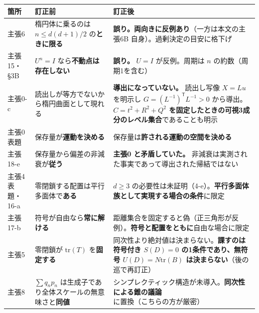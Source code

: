 \documentclass[
  10pt,
]{ltjsarticle}
\newcounter{none} %
\begin{document}
{\def\LTcaptype{none} %
\begin{longtable}[]{@{}
  >{\raggedright\arraybackslash}p{}
  >{\raggedright\arraybackslash}p{}
  >{\raggedright\arraybackslash}p{}@{}}
\toprule\noalign{}
\begin{minipage}[b]{\linewidth}\raggedright
箇所
\end{minipage} & \begin{minipage}[b]{\linewidth}\raggedright
訂正前
\end{minipage} & \begin{minipage}[b]{\linewidth}\raggedright
訂正後
\end{minipage} \\
\midrule\noalign{}
\endhead
\bottomrule\noalign{}
\endlastfoot
主張6 & 楕円体に乗るのは \(n\le d(d+1)/2\) の\textbf{ときに限る} &
\textbf{誤り。両向きに反例あり}（一方は本文の主張6B
自身）。過剰決定の目安に格下げ \\
主張15・§3B & \(U^n=I\) なら\textbf{不動点は存在しない} &
\textbf{誤り。} \(U=I\) が反例。周期は \(n\) の約数（周期1を含む） \\
主張0-c & 読出しが等方でないから楕円曲面として現れる &
\textbf{導出になっていない。} 読出し写像 \(X=Lu\) を明示し
\(G=(L^{-1})^{\mathsf T}L^{-1}>0\) から導出。\textbf{\(C=t^2+R^2+Q^2\)
を固定したときの可視3成分のレベル集合}であることも明示 \\
主張0 表題 & 保存量が\textbf{運動を決める} &
保存量は\textbf{許される運動の空間を決める} \\
主張18-e & 保存量から偏差の非減衰が\textbf{従う} & \textbf{主張0
と矛盾していた。}
非減衰は実測された事実であって導出された帰結ではない \\
主張4 表題・16-a & 零閉鎖する配置は平行多面体で\textbf{ある} & \(d\ge3\)
の必要性は未証明（4-e）。\textbf{平行多面体族として実現する場合の条件}に限定 \\
主張17-b & 符号が自由なら\textbf{常に解ける} &
距離集合を固定すると偽（正三角形が反例）。\textbf{符号と配置をともに}自由な場合に限定 \\
主張5 & 零閉鎖が \(\mathrm{tr}(T)\) を\textbf{固定する} &
同次性より絶対値は決まらない。\textbf{課すのは符号付き \(S(D)=0\)
の1条件であり、無符号 \(U(D)=N\mathrm{tr}(B)\)
は決まらない}（後の巡で再訂正） \\
主張8 & \(\sum q_np_n\)
は生成子であり全体スケールの無意味さと\textbf{同値} &
シンプレクティック構造が未導入。\textbf{同次性による錐の議論}に置換（こちらの方が厳密） \\

\end{longtable}}
\end{document}
